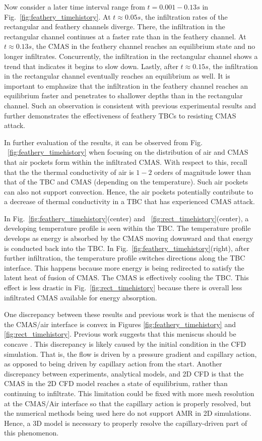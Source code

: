 \documentclass{UCF_ETD}
\begin{document}
Now consider a later time interval range from $t=0.001 - 0.13 s$ in Fig.~\ref{fig:feathery_timehistory}.
At $t \approx 0.05s$, the infiltration rates of the rectangular and feathery channels diverge.
There, the infiltration in the rectangular channel continues at a faster rate than in the feathery channel.
At $t \approx 0.13 s$, the CMAS in the feathery channel reaches an equilibrium state and no longer infiltrates. Concurrently, the infiltration in the rectangular channel shows a trend that indicates it begins to slow down.
Lastly, after $t \approx 0.15 s$, the infiltration in the rectangular channel eventually reaches an equilibrium as well.
It is important to emphasize that the infiltration in the feathery channel reaches an equilibrium faster and penetrates to shallower depths than in the rectangular channel.
Such an observation is consistent with previous experimental results \cite{Naraparaju2017} and further demonstrates the effectiveness of feathery TBCs to resisting CMAS attack.

In further evaluation of the results, it can be observed from Fig. ~\ref{fig:feathery_timehistory} when focusing on the distribution of air and CMAS that air pockets form within the infiltrated CMAS.
With respect to this, recall that the the thermal conductivity of air is $1-2$ orders of magnitude lower than that of the TBC and CMAS (depending on the temperature). Such air pockets can also not support convection. Hence, the air pockets potentially contribute to a decrease of thermal conductivity in a TBC that has experienced CMAS attack.

In Fig.~\ref{fig:feathery_timehistory}(center) and ~\ref{fig:rect_timehistory}(center), a developing temperature profile is seen within the TBC. The temperature profile develops as energy is absorbed by the CMAS moving downward and that energy is conducted back into the TBC. 
In Fig.~\ref{fig:feathery_timehistory}(right), after further infiltration, the temperature profile switches directions along the TBC interface.
This happens because more energy is being redirected to satisfy the latent heat of fusion of CMAS. The CMAS is effectively cooling the TBC.
This effect is less drastic in Fig.~\ref{fig:rect_timehistory} because there is overall less infiltrated CMAS available for energy absorption.

One discrepancy between these results and previous work is that the meniscus of the CMAS/air interface is convex in Figures \ref{fig:feathery_timehistory} and \ref{fig:rect_timehistory}. Previous work suggests that this meniscus should be concave \cite{Naraparaju2019}. This discrepancy is likely caused by the initial condition in the CFD simulation. That is, the flow is driven by a pressure gradient and capillary action, as opposed to being driven by capillary action from the start. Another discrepancy between experiments, analytical models, and 2D CFD is that the CMAS in the 2D CFD model reaches a state of equilibrium, rather than continuing to infiltrate. This limitation could be fixed with more mesh resolution at the CMAS/Air interface so that the capillary action is properly resolved, but the numerical methods being used here do not support AMR in 2D simulations. Hence, a 3D model is necessary to properly resolve the capillary-driven part of this phenomenon. 
\end{document}
